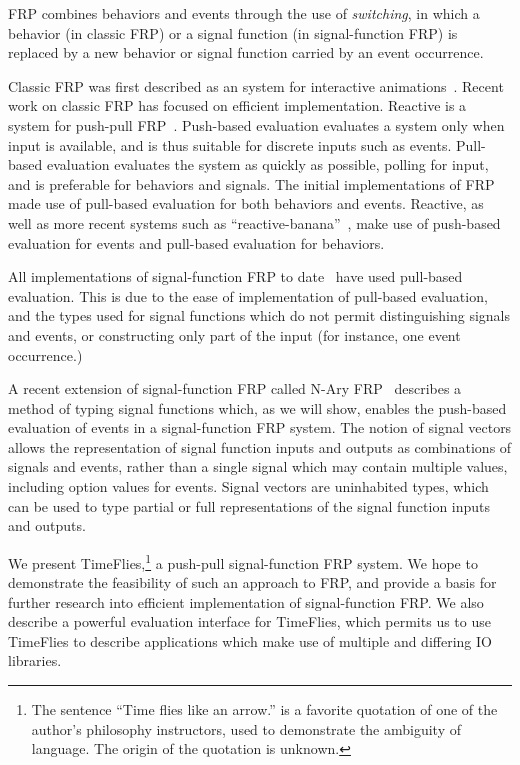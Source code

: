 \documentclass[draft]{llncs}
\begin{document}
FRP combines behaviors and events through the use of {\em switching}, in which
a behavior (in classic FRP) or a signal function (in signal-function FRP) is
replaced by a new behavior or signal function carried by an event occurrence.

Classic FRP was first described as an system for interactive animations~\cite{Elliott1997}.
Recent work on classic FRP has focused on efficient implementation. Reactive is
a system for push-pull FRP~\cite{Elliott2009}. Push-based evaluation evaluates a
system only when input is available, and is thus suitable for discrete inputs
such as events. Pull-based evaluation evaluates the system as quickly as
possible, polling for input, and is preferable for behaviors and signals.
The initial implementations of FRP made use of pull-based evaluation for both
behaviors and events. Reactive, as well as more recent systems such as
``reactive-banana''~\cite{Apfelmus}, make use of push-based evaluation for
events and pull-based evaluation for behaviors.

All implementations of signal-function FRP to date~\cite{Courtney2001-1,Nilsson2002,Nilsson2005,Sculthorpe2011}
have used pull-based evaluation. This is due to the ease of implementation of
pull-based evaluation, and the types used for signal functions which do not
permit distinguishing signals and events, or constructing only part of the
input (for instance, one event occurrence.)

A recent extension of signal-function FRP called N-Ary FRP~\cite{Sculthorpe2011}
describes a method of typing signal functions which, as we will show, enables
the push-based evaluation of events in a signal-function FRP system. The notion
of signal vectors allows the representation of signal function inputs and
outputs as combinations of signals and events, rather than a single signal which
may contain multiple values, including option values for events. Signal vectors
are uninhabited types, which can be used to type partial or full representations
of the signal function inputs and outputs.

We present TimeFlies,\footnote{The sentence ``Time flies like an arrow.'' is a 
favorite quotation of one of the author's philosophy instructors, used to
demonstrate the ambiguity of language. The origin of the quotation is unknown.}
a push-pull signal-function FRP system. We hope to demonstrate the feasibility
of such an approach to FRP, and provide a basis for further research into
efficient implementation of signal-function FRP. We also describe a powerful
evaluation interface for TimeFlies, which permits us to use TimeFlies to
describe applications which make use of multiple and differing IO libraries.
\end{document}
